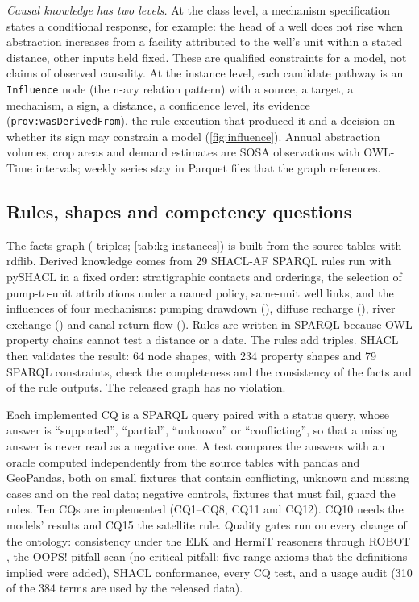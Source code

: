 \emph{Causal knowledge has two levels.} At the class level, a mechanism specification states a
conditional response, for example: the head of a well does not rise when abstraction increases
from a facility attributed to the well's unit within a stated distance, other inputs held fixed.
These are qualified constraints for a model, not claims of observed causality. At the instance
level, each candidate pathway is an \texttt{Influence} node (the n-ary relation pattern) with a
source, a target, a mechanism, a sign, a distance, a confidence level, its evidence
(\texttt{prov:wasDerivedFrom}), the rule execution that produced it and a decision on whether its
sign may constrain a model (\cref{fig:influence}). Annual abstraction volumes, crop areas and demand estimates are SOSA
observations with OWL-Time intervals; weekly series stay in Parquet files that the graph
references.

\subsection{Rules, shapes and competency questions}\label{sec:kg-rules}

The facts graph (\nKgFactTriples{} triples; \cref{tab:kg-instances}) is built from the source tables
with rdflib. Derived knowledge comes from 29 SHACL-AF SPARQL rules \citep{W3C2017Shacl,W3C2017ShaclAf} run with pySHACL \citep{Sommer2026Pyshacl}
in a fixed order: stratigraphic contacts and orderings, the selection of pump-to-unit
attributions under a named policy, same-unit well links, and the influences of four mechanisms:
pumping drawdown (\nInflPumping), diffuse recharge (\nInflRecharge), river exchange (\nInflRiver) and
canal return flow (\nInflCanal). Rules are written in SPARQL because OWL property chains cannot test
a distance or a date. The rules add \nKgRuleTriples{} triples. SHACL then validates the result:
64 node shapes, with 234 property shapes and 79 SPARQL constraints, check the completeness and
the consistency of the facts and of the rule outputs. The released graph has no violation.

Each implemented CQ is a SPARQL query paired with a status query, whose answer is
``supported'', ``partial'', ``unknown'' or ``conflicting'', so that a missing
answer is never read as a negative one. A test compares the answers with an oracle computed
independently from the source tables with pandas and GeoPandas, both on small fixtures that
contain conflicting, unknown and missing cases and on the real data; negative controls, fixtures
that must fail, guard the rules. Ten CQs are implemented (CQ1--CQ8, CQ11 and CQ12). CQ10 needs the
models' results and CQ15 the satellite rule. Quality gates run on every change of the ontology:
consistency under the ELK and HermiT reasoners through ROBOT \citep{Kazakov2013The,Glimm2014Hermit,Jackson2019Robot},
the OOPS! pitfall scan \citep{Povedavillalon2014Oops} (no critical pitfall; five range axioms that
the definitions implied were added), SHACL conformance, every CQ test, and a usage audit (310 of
the 384 terms are used by the released data).

